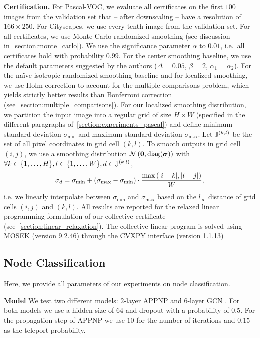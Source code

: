 \textbf{Certification.}
For Pascal-VOC, we evaluate all certificates on the first $100$ images from the validation set that -- after downscaling -- have a resolution of $166 \times 250$.
For Cityscapes, we use every tenth image from the validation set.
For all certificates, we use Monte Carlo randomized smoothing (see discussion in~\autoref{section:monte_carlo}).
We use the significance parameter $\alpha$ to $0.01$, i.e.~all certificates hold with probability $0.99$.
For the center smoothing baseline, we use the default parameters suggested by the authors ($\Delta=0.05$, $\beta=2$, $\alpha_1=\alpha_2$).
For the na\"ive isotropic randomized smoothing baseline and for localized smoothing, we use Holm correction to account for the multiple comparisons problem, which yields strictly better results than Bonferroni correction (see~\autoref{section:multiple_comparisons}).
For our localized smoothing distribution, we partition the input image into a regular grid of size $H \times W$ (specified in the different paragraphs of~\autoref{section:experiments_pascal}) and define minimum standard deviation $\sigma_\mathrm{min}$ and maximum standard deviation $\sigma_\mathrm{max}$.
Let ${\mathbb{J}}^{(k,l)}$ be the set of all pixel coordinates in grid cell $(k,l)$.
To smooth outputs in grid cell $(i,j)$, we use a smoothing distribution
$\mathcal{N}\left(\mathbf{0}, \mathrm{diag}({\bm{\sigma}})\right)$ with $ \forall k \in \{1,\dots,H\}, l \in \{1,\dots,W\}, d \in {\mathbb{J}}^{(k,l)}$,
\begin{equation}
   {\sigma}_d = \sigma_\mathrm{min} + \left(\sigma_\mathrm{max} -\sigma_\mathrm{min} \right) 
   \cdot \frac{\max \left(|i-k|, |l-j|\right)}{W},
\end{equation}
i.e. we linearly interpolate between $\sigma_\mathrm{min}$ and $\sigma_\mathrm{max}$ based on the $l_\infty$ distance of grid cells $(i,j)$ and $(k,l)$.
All results are reported for the relaxed linear programming formulation of our collective certificate (see~\autoref{section:linear_relaxation}). 
The collective linear program is solved using MOSEK (version 9.2.46) \citep{mosek} through the CVXPY interface (version 1.1.13) 

\subsection{Node Classification} \label{appendix-node-classification-experiments}
Here, we provide  all parameters of our experiments on node classification.

\textbf{Model} We test two different models: $2$-layer APPNP \citep{klicpera2019predict} and $6$-layer GCN \citep{Kipf2017}. For both models we use a hidden size of $64$ and dropout with a probability of $0.5$. For the propagation step of APPNP we use $10$ for the number of iterations and $0.15$ as the teleport probability.

